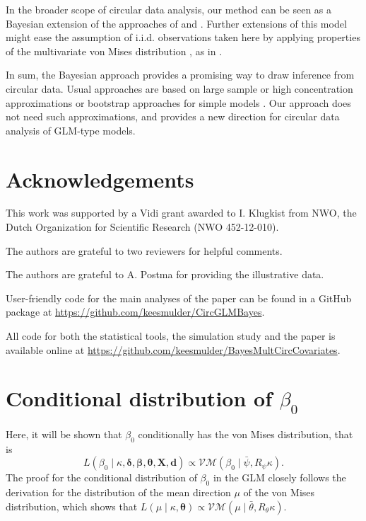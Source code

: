 \documentclass[11pt,a4paper]{article}\usepackage[]{graphicx}\usepackage[]{color}
\newcommand{\bX}{\boldsymbol{X}}
\newcommand{\bt}{\boldsymbol{\theta}}
\newcommand{\bd}{\boldsymbol{d}}
\newcommand{\bdt}{\boldsymbol{\delta}}
\newcommand{\bbt}{\boldsymbol{\beta}}
\begin{document}
In the broader scope of circular data analysis, our method can be seen as a Bayesian extension of the approaches of \citet{artes2008hypothesis} and \citet{lagona2016regression}. Further extensions of this model might ease the assumption of i.i.d. observations taken here by applying properties of the multivariate von Mises distribution \citep{mardia2008multivariate, mardia2014some}, as in \citet{lagona2016regression}.

In sum, the Bayesian approach provides a promising way to draw inference from circular data. Usual approaches are based on large sample or high concentration approximations \citep{artes2008hypothesis} or bootstrap approaches for simple models \citep{baayen2012test, baayen2014evaluating}. Our approach does not need such approximations, and provides a new direction for circular data analysis of GLM-type models.

\section{Acknowledgements}

This work was supported by a Vidi grant awarded to I. Klugkist from NWO, the Dutch Organization for Scientific Research (NWO 452-12-010).

The authors are grateful to two reviewers for helpful comments.

The authors are grateful to A. Postma for providing the illustrative data.

User-friendly code for the main analyses of the paper can be found in a GitHub package at \url{https://github.com/keesmulder/CircGLMBayes}.

All code for both the statistical tools, the simulation study and the paper is available online at \url{https://github.com/keesmulder/BayesMultCircCovariates}.





\newpage

\appendix

\section{Conditional distribution of $\beta_0$} \label{beta0}

Here, it will be shown that $\beta_0$ conditionally has the von Mises distribution, that is
\begin{equation}
L(\beta_0 \mid \kappa, \bdt, \bbt, \bt, \bX, \bd)  \propto \mathcal{VM}(\beta_0 \mid \bar\psi, R_{\psi}\kappa).
\end{equation} %
The proof for the conditional distribution of $\beta_0$ in the GLM closely follows the derivation for the distribution of the mean direction $\mu$ of the von Mises distribution, which shows that $L(\mu \mid \kappa, \boldsymbol\theta) \propto \mathcal{VM}(\mu \mid \bar\theta, R_{\theta} \kappa)$.
\end{document}
